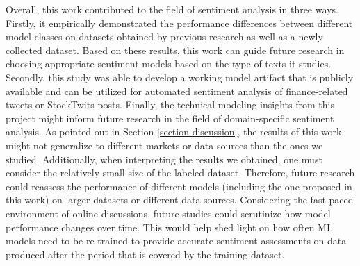 Overall, this work contributed to the field of sentiment analysis in three ways. Firstly, it empirically demonstrated the performance differences between different model classes on datasets obtained by previous research as well as a newly collected dataset. Based on these results, this work can guide future research in choosing appropriate sentiment models based on the type of texts it studies. Secondly, this study was able to develop a working model artifact that is publicly available and can be utilized for automated sentiment analysis of finance-related tweets or StockTwits posts. Finally, the technical modeling insights from this project might inform future research in the field of domain-specific sentiment analysis.\newline
As pointed out in Section \ref{section-discussion}, the results of this work might not generalize to different markets or data sources than the ones we studied. Additionally, when interpreting the results we obtained, one must consider the relatively small size of the labeled dataset. Therefore, future research could reassess the performance of different models (including the one proposed in this work) on larger datasets or different data sources. Considering the fast-paced environment of online discussions, future studies could scrutinize how model performance changes over time. This would help shed light on how often ML models need to be re-trained to provide accurate sentiment assessments on data produced after the period that is covered by the training dataset.